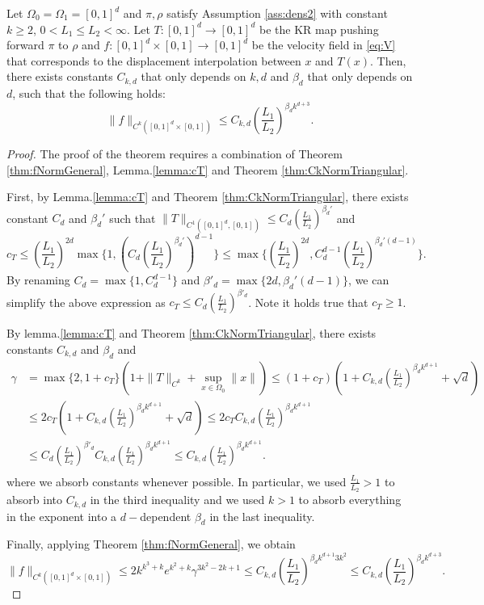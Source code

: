 \begin{theorem}\label{thm:tri}
Let $\Omega_0 = \Omega_1 = [0,1]^d$ and $\pi, \rho$ satisfy Assumption \ref{ass:dens2} with constant $k \geq 2$, $0 < L_1 \leq L_2 < \infty$. Let $T: [0,1]^d\rightarrow[0,1]^d$ be the KR map pushing forward $\pi$ to $\rho$ and $f:[0,1]^d\times[0,1]\rightarrow[0,1]^d$ be the velocity field in \eqref{eq:V} that corresponds to the displacement interpolation between $x$ and $T(x)$. Then, there exists constants $C_{k,d}$ that only depends on $k, d$ and $\beta_d$ that only depends on $d$, 
such that the following holds:
$$\|f\|_{C^k([0,1]^d\times[0,1])} \leq C_{k,d}\left(\frac{L_1}{L_2}\right)^{\beta_dk^{d+3}}.$$
\end{theorem}
\begin{proof}
The proof of the theorem requires a combination of Theorem \ref{thm:fNormGeneral}, Lemma.\ref{lemma:cT} and Theorem \ref{thm:CkNormTriangular}. 

First, by Lemma.\ref{lemma:cT} and Theorem \ref{thm:CkNormTriangular}, there exists constant $C_{d}$ and $\beta_d'$ such that $\|T\|_{C^1([0,1]^d, [0,1])} \leq C_{d}(\frac{L_1}{L_2})^{\beta_d'}$ and 
$$c_T \leq (\frac{L_1}{L_2})^{2d}\max\{1, (C_{d}(\frac{L_1}{L_2})^{\beta_d'})^{d-1}\}\leq \max\{(\frac{L_1}{L_2})^{2d}, C_d^{d-1}(\frac{L_1}{L_2})^{\beta_d'(d-1)}\}.$$
By renaming $C_d = \max\{1, C_d^{d-1}\}$ and $\beta'_d = \max\{2d, \beta_d'(d-1)\}$, we can simplify the above expression as $c_T \leq C_d(\frac{L_1}{L_2})^{\beta'_d}$. Note it holds true that $c_T \geq 1$. 

By lemma.\ref{lemma:cT} and Theorem \ref{thm:CkNormTriangular}, there exists constants $C_{k,d}$ and $\beta_d$ and  
\begin{align*}
 \gamma &= \max\{2, 1+c_T\}(1 + \|T\|_{C^k} + \sup_{x\in\Omega_0}\|x\|)\leq (1 + c_T)(1 + C_{k,d}(\frac{L_1}{L_2})^{\beta_dk^{d+1}} + \sqrt{d})\\
 &\leq 2c_T(1 + C_{k,d}(\frac{L_1}{L_2})^{\beta_dk^{d+1}} + \sqrt{d})\leq 2c_TC_{k,d}(\frac{L_1}{L_2})^{\beta_dk^{d+1}}\\
 &\leq C_d(\frac{L_1}{L_2})^{\beta'_d}C_{k,d}(\frac{L_1}{L_2})^{\beta_d k^{d+1}} \leq C_{k,d}(\frac{L_1}{L_2})^{\beta_dk^{d+1}}.\\
\end{align*}
where we absorb constants whenever possible. In particular, we used $\frac{L_1}{L_2} > 1$ to absorb into $C_{k,d}$ in the third inequality and we used $k>1$ to absorb everything in the exponent into a $d-$dependent $\beta_d$ in the last inequality. 

Finally, applying Theorem \ref{thm:fNormGeneral}, we obtain
$$\|f\|_{C^k([0,1]^d\times[0,1])}\leq 2k^{k^3+k}e^{k^2+k}\gamma^{3k^2-2k+1} \leq C_{k,d} (\frac{L_1}{L_2})^{\beta_dk^{d+1}3k^2} \leq C_{k,d}(\frac{L_1}{L_2})^{\beta_dk^{d+3}}.$$
\end{proof}







